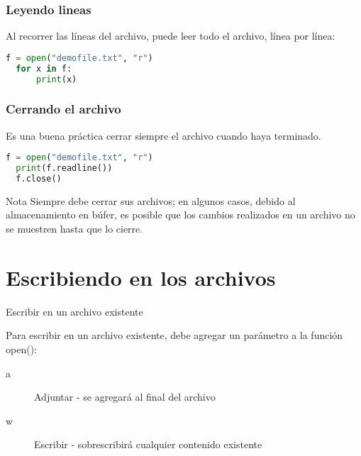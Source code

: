 \begin{frame}[fragile]
  \frametitle{Leyendo lineas}

  Al recorrer las líneas del archivo, puede leer todo el
  archivo, línea por línea:

  \vspace{\baselineskip}
  \begin{lstlisting}[language=Python]
  f = open("demofile.txt", "r")
  for x in f:
      print(x)
  \end{lstlisting}
\end{frame}

\begin{frame}[fragile]
  \frametitle{Cerrando el archivo}

  Es una buena práctica cerrar siempre el archivo
  cuando haya terminado.

  \vspace{\baselineskip}
  \begin{lstlisting}[language=Python]
  f = open("demofile.txt", "r")
  print(f.readline())
  f.close()
  \end{lstlisting}

  \pausa
  \begin{exampleblock}{Nota}
    Siempre debe cerrar sus archivos; en algunos casos,
    debido al almacenamiento en búfer, es posible que los
    cambios realizados en un archivo no se muestren hasta
    que lo cierre. 
  \end{exampleblock}
\end{frame}

\section{Escribiendo en los archivos}

\begin{frame}[c]{Escribir en un archivo existente}

  Para escribir en un archivo existente, debe agregar un
  parámetro a la función \textcolor{codeKeyword2}{open}():

  \vspace{\baselineskip}
  \begin{description}
    \item[a] Adjuntar - se agregará al final del archivo
    \item[w] Escribir - sobrescribirá cualquier contenido existente 
  \end{description}
\end{frame}

